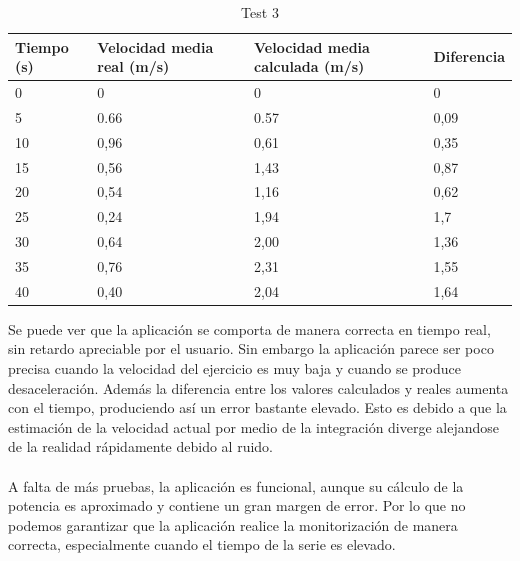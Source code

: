 \begin{table}[H]
\centering
\caption{Test 3}
\label{Test 3}
\begin{tabular}{|l|l|l|l|}
\hline
Tiempo (s) & Velocidad media real (m/s) & Velocidad media calculada (m/s) & Diferencia \\ \hline
0          & 0                          & 0                         & 0          \\ \hline
5          & 0.66                       & 0.57                      & 0,09       \\ \hline
10         & 0,96                       & 0,61                      & 0,35       \\ \hline
15         & 0,56                       & 1,43                      & 0,87       \\ \hline
20         & 0,54                       & 1,16                      & 0,62       \\ \hline
25         & 0,24                       & 1,94                      & 1,7        \\ \hline
30         & 0,64                       & 2,00                      & 1,36       \\ \hline
35         & 0,76                       & 2,31                      & 1,55       \\ \hline
40         & 0,40                       & 2,04                      & 1,64       \\ \hline
\end{tabular}
\end{table}

\noindent
Se puede ver que la aplicación se comporta de manera correcta en tiempo real, sin retardo apreciable por el usuario. Sin embargo la aplicación parece ser poco precisa cuando la velocidad del ejercicio es muy baja y cuando se produce desaceleración. Además la diferencia entre los valores calculados y reales aumenta con el tiempo, produciendo así un error bastante elevado. Esto es debido a que la estimación de la velocidad actual por medio de la integración diverge alejandose de la realidad rápidamente debido al ruido.
\\
\\
A falta de más pruebas, la aplicación es funcional, aunque su cálculo de la potencia es aproximado y contiene un gran margen de error. Por lo que no podemos garantizar que la aplicación realice la monitorización de manera correcta, especialmente cuando el tiempo de la serie es elevado.
